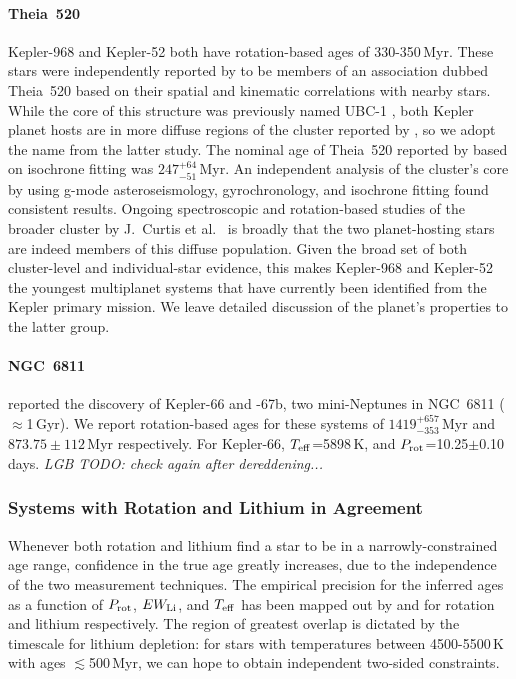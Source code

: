 \documentclass[11pt,twocolumn,tighten]{aastex63}
\begin{document}
\paragraph{Theia~520}
Kepler-968 and Kepler-52 both have rotation-based ages of
330-350\,Myr.  These stars were independently reported by
\citet{2019AJ....158..122K} to be members of an association dubbed
Theia~520 based on their spatial and kinematic correlations with
nearby stars.  While the core of this structure was previously named
UBC-1 \citep{2018A&A...618A..59C}, both Kepler planet hosts are in
more diffuse regions of the cluster reported by
\citet{2019AJ....158..122K}, so we adopt the name from the latter
study.  The nominal age of Theia~520 reported by
\citet{2019AJ....158..122K} based on isochrone fitting was
$247^{+64}_{-51}$\,Myr.  An independent analysis of the cluster's core
by \citet{2024A&A...681A..13F} using g-mode asteroseismology,
gyrochronology, and isochrone fitting found consistent results.
Ongoing spectroscopic and rotation-based studies of the broader
cluster by J.~Curtis et al.~ is broadly that the two planet-hosting
stars are indeed members of this diffuse population.  Given the broad
set of both cluster-level and individual-star evidence, this makes
Kepler-968 and Kepler-52 the youngest multiplanet systems that have
currently been identified from the Kepler primary mission.
We leave detailed discussion of the planet's properties to the latter 
group.

\paragraph{NGC~6811}
\citet{Meibom_2013} reported the discovery of Kepler-66 and -67b, two
mini-Neptunes in NGC~6811 ($\approx$1\,Gyr).
We report rotation-based ages for these systems of
$1419^{+657}_{-353}$\,Myr and $873.75\pm{112}$\,Myr respectively.
For Kepler-66, $T_{\rm eff}$=5898\,K, and $P_{\rm
rot}$=10.25$\pm$0.10\,days.
{\it LGB TODO: check again after dereddening...}



\subsubsection{Systems with Rotation and Lithium in Agreement}
%
Whenever both rotation and lithium find a star to be in a
narrowly-constrained age range, confidence in the true age greatly
increases, due to the independence of the two measurement techniques.
The empirical precision for the inferred ages as a function of $P_{\rm
rot}$, $EW_{\rm Li}$, and $T_{\rm eff}$ has been mapped out by
\citet{Bouma_2023} and \citet{Jeffries_2023} for rotation and lithium
respectively.  The region of greatest overlap is dictated by the
timescale for lithium depletion: for stars with temperatures between
4500-5500\,K with ages $\lesssim$500\,Myr, we can hope to obtain
independent two-sided constraints.
\end{document}
